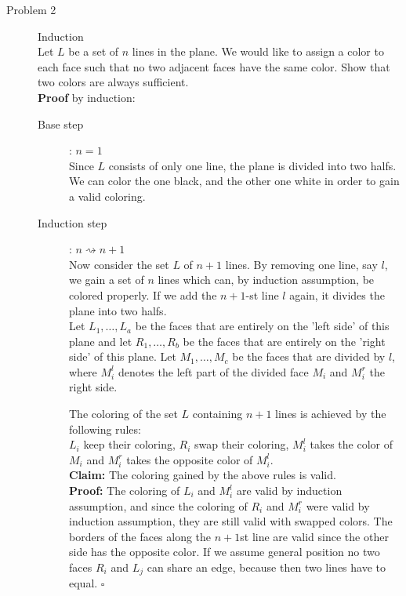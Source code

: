 \documentclass[11pt,a4paper,ngerman]{article}
\begin{document}
\begin{description}
\item[Problem 2] Induction \\
Let $L$ be a set of $n$ lines in the plane. We would like to assign a color to each face such that no two adjacent faces have the same color. Show that two colors are always sufficient.\\

\textbf{Proof} by induction:
\begin{description}
\item[Base step]: $n = 1$ \\
Since $L$ consists of only one line, the plane is divided into two halfs. We can color the one black,
and the other one white in order to gain a valid coloring.
\item[Induction step]: $n \rightsquigarrow n + 1$ \\
Now consider the set $L$ of $n+1$ lines. By removing one line, say $l$, we gain a set of $n$ lines
which can, by induction assumption, be colored properly. If we add the $n+1$-st line $l$ again,
it divides the plane into two halfs.\\
Let $L_1,\ldots,L_a$ be the faces that are entirely on the
'left side' of this plane and let $R_1,\ldots,R_b$ be the faces that are entirely on the
'right side' of this plane. Let $M_1,\ldots,M_c$ be the faces that are divided by $l$, where $M_i^l$
denotes the left part of the divided face $M_i$ and $M_i^r$ the right side.

The coloring of the set $L$ containing $n+1$ lines is achieved by the following rules:\\
$L_i$ keep their coloring, $R_i$ swap their coloring, $M_i^l$ takes the color of $M_i$ and $M_i^r$ takes
the opposite color of $M_i^l$.\\
\textbf{Claim:} The coloring gained by the above rules is valid.\\
\textbf{Proof:} The coloring of $L_i$ and $M_i^l$ are valid by induction assumption,
                and since the coloring of $R_i$ and $M_i^r$ were valid by induction assumption, they
                are still valid with swapped colors. The borders of the faces along the $n+1$st line
                are valid since the other side has the opposite color.
                If we assume general position no two faces $R_i$ and $L_j$ can share an edge,
                because then two lines have to equal.
\mbox{} \hfill $\square$
\end{description}
  



\end{description}
\end{document}
